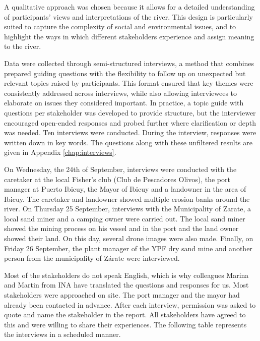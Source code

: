 A qualitative approach was chosen because it allows for a detailed understanding of participants’ views and interpretations of the river. This design is particularly suited to capture the complexity of social and environmental issues, and to highlight the ways in which different stakeholders experience and assign meaning to the river.

Data were collected through semi-structured interviews, a method that combines prepared guiding questions with the flexibility to follow up on unexpected but relevant topics raised by participants. This format ensured that key themes were consistently addressed across interviews, while also allowing interviewees to elaborate on issues they considered important. In practice, a topic guide with questions per stakeholder was developed to provide structure, but the interviewer encouraged open-ended responses and probed further where clarification or depth was needed. Ten interviews were conducted. During the interview, responses were written down in key words. The questions along with these unfiltered results are given in Appendix \ref{chap:interviews}.

On Wednesday, the 24th of September, interviews were conducted with the caretaker at the local Fisher's club (Club de Pescadores Olivos), the port manager at Puerto Ibicuy, the Mayor of Ibicuy and a landowner in the area of Ibicuy. The caretaker and landowner showed multiple erosion banks around the river. On Thursday 25 September, interviews with the Municipality of Zarate, a local sand miner and a camping owner were carried out. The local sand miner showed the mining process on his vessel and in the port and the land owner showed their land. On this day, several drone images were also made. Finally, on Friday 26 September, the plant manager of the YPF dry sand mine and another person from the municipality of Zárate were interviewed. 

Most of the stakeholders do not speak English, which is why colleagues Marina and Martin from INA have translated the questions and responses for us. Most stakeholders were approached on site. The port manager and the mayor had already been contacted in advance. After each interview, permission was asked to quote and name the stakeholder in the report. All stakeholders have agreed to this and were willing to share their experiences. The following table represents the interviews in a scheduled manner. 

